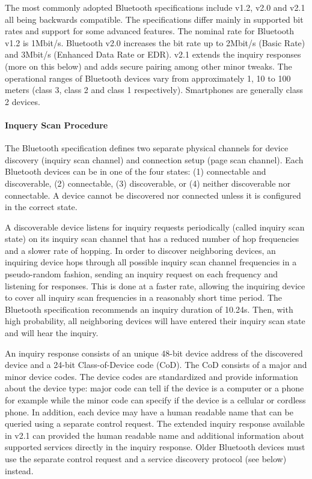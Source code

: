 The most commonly adopted Bluetooth specifications include v1.2, v2.0 and v2.1 all being backwards compatible. The specifications differ mainly in supported bit rates and support for some advanced features. The nominal rate for Bluetooth v1.2 is 1Mbit/s. Bluetooth v2.0 increases the bit rate up to 2Mbit/s (Basic Rate) and 3Mbit/s (Enhanced Data Rate or EDR). v2.1 extends the inquiry responses (more on this below) and adds secure pairing among other minor tweaks. The operational ranges of Bluetooth devices vary from approximately 1, 10 to 100 meters (class 3, class 2 and class 1 respectively). Smartphones are generally class 2 devices.

\paragraph*{Inquery Scan Procedure}

The Bluetooth specification defines two separate physical channels for device discovery (inquiry scan channel) and connection setup (page scan channel).  Each Bluetooth devices can be in one of the four states: (1) connectable and discoverable, (2) connectable, (3) discoverable, or (4) neither discoverable nor connectable. A device cannot be discovered nor connected unless it is configured in the correct state.

A discoverable device listens for inquiry requests periodically (called inquiry scan state) on its inquiry scan channel that has a reduced number of hop frequencies and a slower rate of hopping. In order to discover neighboring devices, an inquiring device hops through all possible inquiry scan channel frequencies in a pseudo-random
 fashion, sending an inquiry request on each frequency and listening for responses. This is done at a faster rate, allowing the inquiring device to cover all inquiry scan 
 frequencies in a reasonably short time period. The Bluetooth specification recommends an inquiry duration of 10.24s. Then, with high probability, all neighboring devices will
have entered their inquiry scan state and will hear the inquiry.

An inquiry response consists of an unique 48-bit device address of the discovered device and a 24-bit Class-of-Device code (CoD). The CoD consists of a major and 
minor device codes. The device codes are standardized and provide information about the device type: major code can tell if the device is a computer or a phone for 
example while the minor code can specify if the device is a cellular or cordless phone. In addition, each device may have a human readable name that can be queried using
a separate control request. The extended inquiry response available in v2.1 can provided the human readable name and additional information about supported services
directly in the inquiry response. Older Bluetooth devices must use the separate control request and a service discovery protocol (see below) instead.

